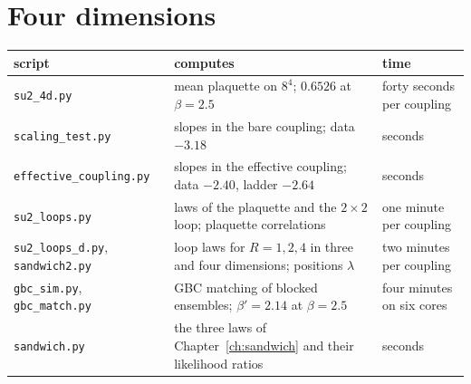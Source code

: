\section{Four dimensions}
\begin{center}
\footnotesize
\begin{tabular}{p{1.3in}p{2.05in}p{0.7in}}
\toprule
script & computes & time \\ \midrule
\texttt{su2\_4d.py} & mean plaquette on $8^4$; $0.6526$ at $\beta=2.5$ & forty seconds per coupling \\
\texttt{scaling\_test.py} & slopes in the bare coupling; data $-3.18$ & seconds \\
\texttt{effective\_}\allowbreak\texttt{coupling.py} & slopes in the effective coupling; data $-2.40$, ladder $-2.64$ & seconds \\
\texttt{su2\_loops.py} & laws of the plaquette and the $2\times2$ loop; plaquette correlations & one minute per coupling \\
\texttt{su2\_loops\_d.py}, \texttt{sandwich2.py} & loop laws for $R=1,2,4$ in three and four dimensions; positions $\lambda$ & two minutes per coupling \\
\texttt{gbc\_sim.py}, \texttt{gbc\_match.py} & GBC matching of blocked ensembles; $\beta'=2.14$ at $\beta=2.5$ & four minutes on six cores \\
\texttt{sandwich.py} & the three laws of Chapter~\ref{ch:sandwich} and their likelihood ratios & seconds \\
\bottomrule
\end{tabular}
\end{center}

